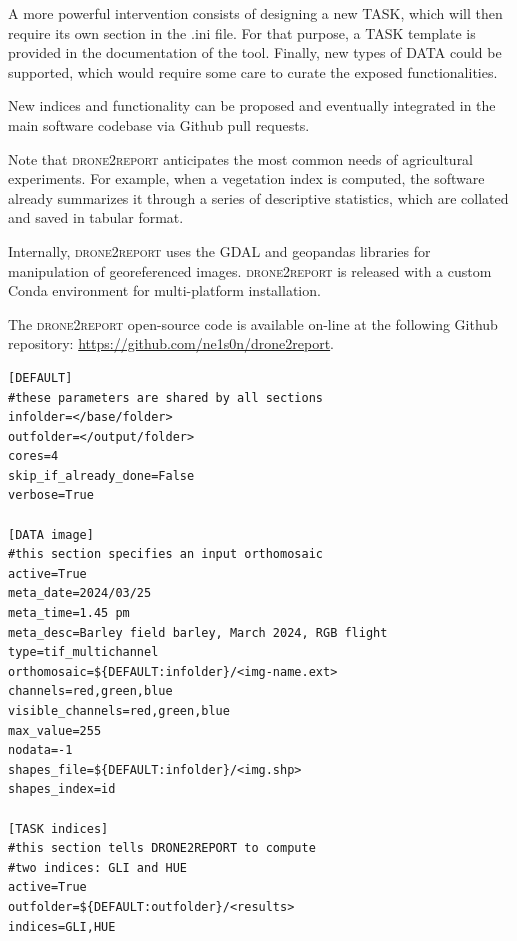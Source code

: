 \documentclass[drones,technicalnote,accept,pdftex,moreauthors]{Definitions/mdpi}
\begin{document}
A more powerful intervention consists of designing a new TASK, which will then require its own section in the .ini file. For that purpose, a TASK template is provided in the documentation of the tool. Finally, new types of DATA could be supported, which would require some care to curate the exposed functionalities.

New indices and functionality can be proposed and eventually integrated in the main software codebase via Github pull requests.

Note that \textsc{drone2report} anticipates the most common needs of agricultural experiments. For example, when a vegetation index is computed, the software already summarizes it through a series of descriptive statistics, which are collated and saved in tabular format.

Internally, \textsc{drone2report} uses the GDAL \cite{GDALmanual} and geopandas \cite{kelsey_jordahl_2020_3946761} libraries for manipulation of georeferenced images. \textsc{drone2report} is released with a custom Conda environment for multi-platform installation.

The \textsc{drone2report} open-source code is available on-line at the following Github repository: \url{https://github.com/ne1s0n/drone2report}.

\begin{minipage}{\hsize}%
\lstset{frame=single,framexleftmargin=-1pt,framexrightmargin=-17pt,framesep=12pt,linewidth=0.98\textwidth,language=bash}%
\begin{lstlisting}[caption={Example of configuration file to run \textsc{drone2report}.
This takes the form of a standard .ini file, divided in sections (between
square brackets) and supporting comments (using the hash symbol}, label={lst:config}]
[DEFAULT]
#these parameters are shared by all sections
infolder=</base/folder>
outfolder=</output/folder>
cores=4
skip_if_already_done=False
verbose=True

[DATA image]
#this section specifies an input orthomosaic
active=True
meta_date=2024/03/25
meta_time=1.45 pm
meta_desc=Barley field barley, March 2024, RGB flight
type=tif_multichannel
orthomosaic=${DEFAULT:infolder}/<img-name.ext>
channels=red,green,blue
visible_channels=red,green,blue
max_value=255 
nodata=-1
shapes_file=${DEFAULT:infolder}/<img.shp>
shapes_index=id

[TASK indices]
#this section tells DRONE2REPORT to compute 
#two indices: GLI and HUE
active=True
outfolder=${DEFAULT:outfolder}/<results>
indices=GLI,HUE
\end{lstlisting}
\end{minipage}
\end{document}
